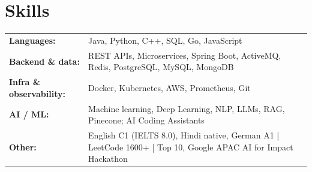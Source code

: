 \documentclass[10pt,a4paper]{article}
\begin{document}
\section{Skills}
\begin{tabularx}{\linewidth}{@{}l X@{}}
\textbf{Languages:} & Java, Python, C++, SQL, Go, JavaScript \\
\textbf{Backend \& data:} & REST APIs, Microservices, Spring Boot, ActiveMQ, Redis, PostgreSQL, MySQL, MongoDB \\
\textbf{Infra \& observability:} & Docker, Kubernetes, AWS, Prometheus, Git \\
\textbf{AI / ML:} & Machine learning, Deep Learning, NLP, LLMs, RAG, Pinecone; AI Coding Assistants \\
\textbf{Other:} & English C1 (IELTS 8.0), Hindi native, German A1 \;|\; LeetCode 1600+ \;|\; Top 10, Google APAC AI for Impact Hackathon \\
\end{tabularx}
\end{document}

